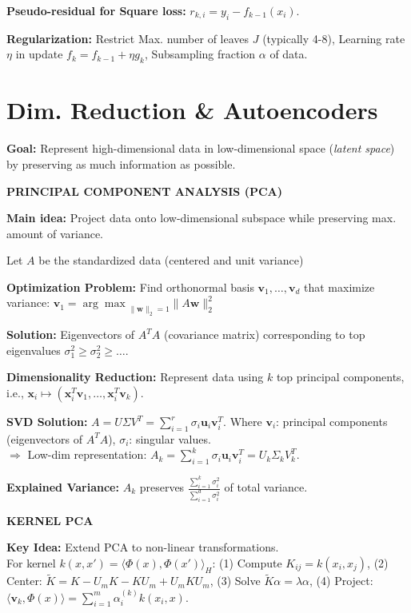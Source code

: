 \documentclass[a4paper,10pt]{article}
\newcommand{\subtitle}[1]{\vspace{0.25cm}\begin{normalsize}\textbf{\textcolor{gray!150}{\uppercase{#1}}}\end{normalsize}}
\begin{document}
\begin{small}
\textbf{Pseudo-residual for Square loss:} $r_{k,i} = y_i - f_{k-1}(x_i)$.

\textbf{Regularization:} Restrict Max. number of leaves $J$ (typically 4-8), Learning rate $\eta$ in update $f_k = f_{k-1} + \eta g_k$, Subsampling fraction $\alpha$ of data.


\section{Dim. Reduction \& Autoencoders}

\textbf{Goal:} Represent high-dimensional data in low-dimensional space (\textit{latent space}) by preserving as much information as possible.

\subtitle{Principal Component Analysis (PCA)}

\textbf{Main idea:} Project data onto low-dimensional subspace while preserving max. amount of variance.

Let $A$ be the standardized data (centered and unit variance)

\textbf{Optimization Problem:} Find orthonormal basis $\mathbf{v}_1, \dots, \mathbf{v}_d$ that maximize variance:
$
\mathbf{v}_1 = {\arg\max}_{\|\mathbf{w}\|_2=1} \|A\mathbf{w}\|_2^2
$

\textbf{Solution:} Eigenvectors of $A^T A$ (covariance matrix) corresponding to top eigenvalues $\sigma_1^2 \geq \sigma_2^2 \geq \dots$.

\textbf{Dimensionality Reduction:} Represent data using $k$ top principal components, i.e., $\mathbf{x}_i \mapsto (\mathbf{x}_i^T \mathbf{v}_1, \dots, \mathbf{x}_i^T \mathbf{v}_k).
$

\textbf{SVD Solution:} $A = U\Sigma V^T = \sum_{i=1}^r \sigma_i \mathbf{u}_i \mathbf{v}_i^T$. Where $\mathbf{v}_i$: principal components (eigenvectors of $A^TA$), $\sigma_i$: singular values. \\
$\Rightarrow$ Low-dim representation: $A_k = \sum_{i=1}^k \sigma_i \mathbf{u}_i \mathbf{v}_i^T = U_k\Sigma_kV_k^T.$

\textbf{Explained Variance:} $A_k$ preserves
$
\frac{\sum_{i=1}^k \sigma_i^2}{\sum_{i=1}^d \sigma_i^2}
$
of total variance.

\subtitle{Kernel PCA}

\textbf{Key Idea:} Extend PCA to non-linear transformations. \\ For kernel $k(x,x')=\langle \Phi(x), \Phi(x') \rangle_H$:
(1) Compute $K_{ij} = k(x_i,x_j)$, (2) Center: $\tilde{K} = K - U_mK - KU_m + U_mKU_m$, (3) Solve $\tilde{K}\alpha = \lambda\alpha$, (4) Project: $\langle \mathbf{v}_k, \Phi(x) \rangle = \sum_{i=1}^m \alpha_i^{(k)} k(x_i,x)$.


\end{small}
\end{document}
